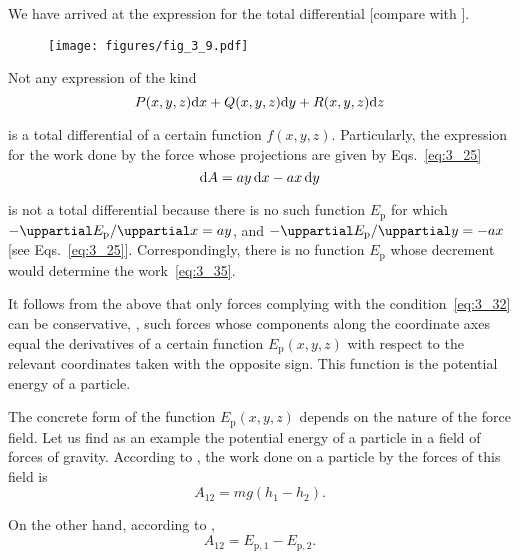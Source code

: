 \noindent
We have arrived at the expression for the total differential [compare with ].

\begin{figure}[t]
	\begin{center}
		\texttt{[image: figures/fig\_3\_9.pdf]}
		\caption[]{}
		\label{fig:3_9}
	\end{center}
	\vspace{-0.7cm}
\end{figure}

Not any expression of the kind
\begin{equation*}
P(x,y,z)\mathrm{d} x + Q(x,y,z)\mathrm{d} y + R(x,y,z)\mathrm{d} z
\end{equation*}

\noindent
is a total differential of a certain function $f(x,y,z)$. Particularly, the expression for the work done by the force whose projections are given by Eqs.~\eqref{eq:3_25}
\begin{equation}\label{eq:3_35}
\mathrm{d} A = ay\,\mathrm{d} x - ax\,\mathrm{d} y
\end{equation}

\noindent
is not a total differential because there is no such function $E_{\text{p}}$ for which $-\diffinpartial{E_{\text{p}}}{x}=ay$, and $-\diffinpartial{E_{\text{p}}}{y}=-ax$ [see Eqs.~\eqref{eq:3_25}]. Correspondingly, there is no function $E_{\text{p}}$ whose decrement would determine the work~\eqref{eq:3_35}.

It follows from the above that only forces complying with the condition~\eqref{eq:3_32} can be conservative, \ie, such forces whose components along the coordinate axes equal the derivatives of a certain function $E_{\text{p}}(x,y,z)$ with respect to the relevant coordinates taken with the opposite sign. This function is the potential energy of a particle.

The concrete form of the function $E_{\text{p}}(x,y,z)$ depends on the nature of the force field. Let us find as an example the potential energy of a particle in a field of forces of gravity. According to , the work done on a particle by the forces of this field is
\begin{equation*}
A_{12} = mg(h_1-h_2).
\end{equation*}

\noindent
On the other hand, according to ,
\begin{equation*}
A_{12} = E_{\text{p},1} - E_{\text{p},2}.
\end{equation*}

